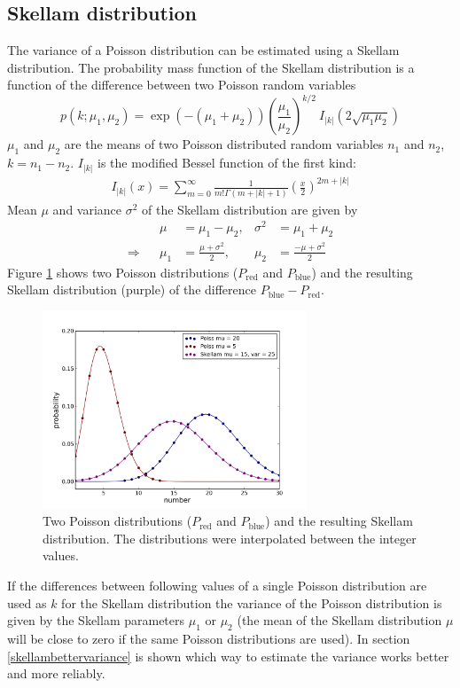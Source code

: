 \subsection{Skellam distribution}\label{skellamdist}
The variance of a Poisson distribution can be estimated using a Skellam distribution.
The probability
mass function of the Skellam distribution is a function of the difference between
two Poisson random variables
\begin{equation}
	p(k;\mu_1, \mu_2) =
	\exp(-(\mu_1+\mu_2))\left(\frac{\mu_1}{\mu_2}\right)^{k/2}~I_{|k|}\left(2\sqrt{\mu_1
	\mu_2}\right)
\end{equation}  
$\mu_1$ and $\mu_2$ are the means of two Poisson distributed random variables $n_1$ and $n_2$, $k = n_1 - n_2$.
$I_{|k|}$ is the modified Bessel function of the first kind:
\begin{align}
I_{|k|}(x) =\sum_{m=0}^\infty \frac{1}{m! \Gamma(m+|k|+1)}\left(\frac{x}{2}\right)^{2m+|k|}
\end{align}
Mean $\mu$ and variance $\sigma^2$ of the Skellam distribution are given by
\begin{align}
	&&\mu &= \mu_1 - \mu_2,& \sigma^2 &= \mu_1 + \mu_2\\
	\Rightarrow &&\mu_1& = \frac{\mu + \sigma^2}{2},& \mu_2 &=\frac{-\mu +
	\sigma^2}{2}
\end{align}
Figure \ref{skellamdistfig} shows two Poisson distributions ($P_\text{red}$ and $P_\text{blue}$) and the resulting Skellam distribution (purple) of the difference $P_\text{blue} - P_\text{red}$.
\begin{figure}
\centering
\includegraphics[width = 0.7\textwidth]{pictures/skellamdist.png}
	\caption{Two Poisson distributions ($P_\text{red}$ and $P_\text{blue}$) and the resulting Skellam distribution. The distributions were interpolated between the integer values.}
	\label{skellamdistfig}
\end{figure}
If the differences between following values of a single Poisson distribution are used as $k$ for the Skellam distribution the variance of the Poisson distribution is given by the Skellam parameters $\mu_1$ or $\mu_2$ (the mean of the Skellam distribution $\mu$ will be close to zero if the same Poisson distributions are used).\newline
In section \ref{skellambettervariance} is shown which way to estimate the variance works better and more reliably.

